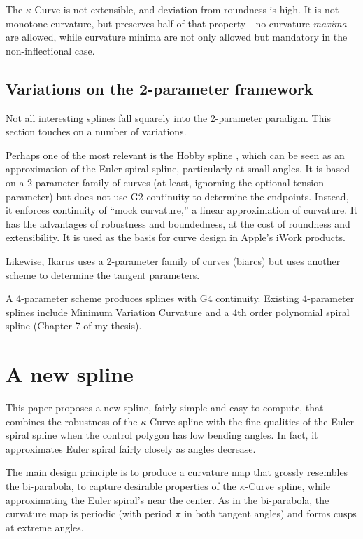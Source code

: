 \documentclass{article}
\newcommand{\kcurve}{$\kappa$-Curve}
\begin{document}
The \kcurve{} is not extensible, and deviation from roundness is high. It is not monotone curvature, but preserves half of that property - no curvature \emph{maxima} are allowed, while curvature minima are not only allowed but mandatory in the non-inflectional case.

\subsection{Variations on the 2-parameter framework}

Not all interesting splines fall squarely into the 2-parameter paradigm. This section touches on a number of variations.

Perhaps one of the most relevant is the Hobby spline \cite{Hobby85}, which can be seen as an approximation of the Euler spiral spline, particularly at small angles. It is based on a 2-parameter family of curves (at least, ignorning the optional tension parameter) but does not use G2 continuity to determine the endpoints. Instead, it enforces continuity of ``mock curvature,'' a linear approximation of curvature. It has the advantages of robustness and boundedness, at the cost of roundness and extensibility. It is used as the basis for curve design in Apple's iWork products.

Likewise, Ikarus \cite{Karow87} uses a 2-parameter family of curves (biarcs) but uses another scheme to determine the tangent parameters.

A 4-parameter scheme produces splines with G4 continuity. Existing 4-parameter splines include Minimum Variation Curvature \cite{Moreton92} and a 4th order polynomial spiral spline (Chapter 7 of my thesis).

\section{A new spline}

This paper proposes a new spline, fairly simple and easy to compute, that combines the robustness of the \kcurve{} spline with the fine qualities of the Euler spiral spline when the control polygon has low bending angles. In fact, it approximates Euler spiral fairly closely as angles decrease.

The main design principle is to produce a curvature map that grossly resembles the bi-parabola, to capture desirable properties of the \kcurve{} spline, while approximating the Euler spiral's near the center. As in the bi-parabola, the curvature map is periodic (with period $\pi$ in both tangent angles) and forms cusps at extreme angles.
\end{document}
